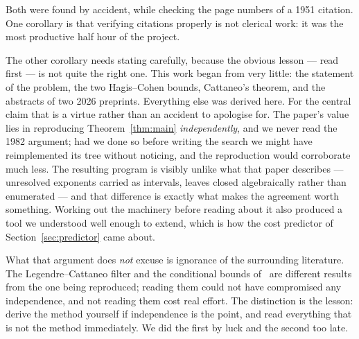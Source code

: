 \documentclass[11pt]{amsart}
\theoremstyle{remark}
\begin{document}
Both were found by accident, while checking the page numbers of a 1951 citation.
One corollary is that verifying citations properly is not clerical work: it was
the most productive half hour of the project.

The other corollary needs stating carefully, because the obvious lesson --- read
first --- is not quite the right one. This work began from very little: the
statement of the problem, the two Hagis--Cohen bounds, Cattaneo's theorem, and
the abstracts of two 2026 preprints. Everything else was derived here. For the
central claim that is a virtue rather than an accident to apologise for. The
paper's value lies in reproducing Theorem~\ref{thm:main} \emph{independently},
and we never read the 1982 argument; had we done so before writing the search we
might have reimplemented its tree without noticing, and the reproduction would
corroborate much less. The resulting program is visibly unlike what that paper
describes --- unresolved exponents carried as intervals, leaves closed
algebraically rather than enumerated --- and that difference is exactly what makes
the agreement worth something. Working out the machinery before reading about it
also produced a tool we understood well enough to extend, which is how the cost
predictor of Section~\ref{sec:predictor} came about.

What that argument does \emph{not} excuse is ignorance of the surrounding
literature. The Legendre--Cattaneo filter and the conditional bounds
of~\cite{prasad} are different results from the one being reproduced; reading them
could not have compromised any independence, and not reading them cost real
effort. The distinction is the lesson: derive the method yourself if independence
is the point, and read everything that is not the method immediately. We did the
first by luck and the second too late.
\end{document}
